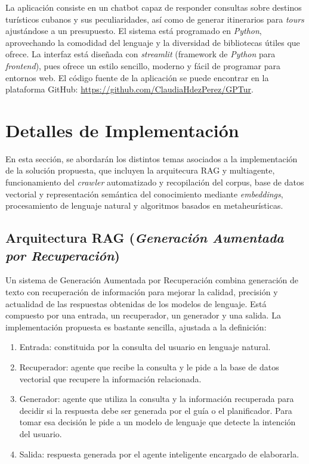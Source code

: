 \documentclass[10pt]{llncs}
\begin{document}
La aplicación consiste en un chatbot capaz de responder consultas sobre destinos turísticos cubanos y sus peculiaridades, así como de generar itinerarios para \textit{tours} ajustándose a un presupuesto. 
El sistema está programado en \textit{Python}, aprovechando la comodidad del lenguaje y la diversidad de bibliotecas útiles que ofrece. La interfaz está diseñada con \textit{streamlit} (framework de \textit{Python} para \textit{frontend}), 
pues ofrece un estilo sencillo, moderno y fácil de programar para entornos web. El código fuente de la aplicación se puede encontrar en 
la plataforma GitHub: \href{https://github.com/ClaudiaHdezPerez/GPTur}{\color{blue}https://github.com/ClaudiaHdezPerez/GPTur}.

\section{Detalles de Implementación}\label{sec:implementacion}

En esta sección, se abordarán los distintos temas asociados a la implementación de la solución propuesta, que incluyen la arquitecura RAG y multiagente, funcionamiento del \textit{crawler} automatizado y recopilación del corpus, base de datos vectorial y representación semántica del 
conocimiento mediante \textit{embeddings}, procesamiento de lenguaje natural y algoritmos basados en metaheurísticas. 

\vspace{\baselineskip}

\subsection{Arquitectura RAG (\textit{Generación Aumentada por Recuperación})}\label{sec:rag}

Un sistema de Generación Aumentada por Recuperación combina generación de texto con recuperación de información para mejorar la calidad, precisión y actualidad de las respuestas obtenidas de los modelos de lenguaje. 
Está compuesto por una entrada, un recuperador, un generador y una salida. La implementación propuesta es bastante sencilla, ajustada a la definición:
\begin{enumerate}
    \item Entrada: constituida por la consulta del usuario en lenguaje natural.
    \item Recuperador: agente que recibe la consulta y le pide a la base de datos vectorial que recupere la información relacionada.
    \item Generador: agente que utiliza la consulta y la información recuperada para decidir si la respuesta debe ser generada por el guía o el planificador. Para tomar esa decisión le pide a un modelo de lenguaje que detecte la intención del usuario.
    \item Salida: respuesta generada por el agente inteligente encargado de elaborarla.
\end{enumerate}
\end{document}
